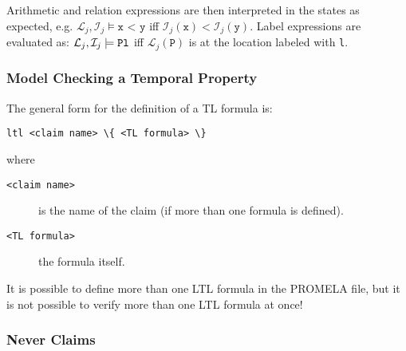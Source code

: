 \documentclass[a4paper, 11pt, accentcolor = tud3b]{tudreport}
\newcommand{\inlinePromela}[1]{\lstinline[language = PROMELA]|#1|}
\begin{document}
						Arithmetic and relation expressions are then interpreted in the states as expected, e.g. \( \mathcal{L}_j, \mathcal{I}_j \models \texttt{x < y} \) iff \( \mathcal{I}_j(\texttt{x}) < \mathcal{I}_j(\texttt{y}) \). Label expressions are evaluated as: \( \mathcal{L}_j, \mathcal{I}_j \models \texttt{P\@l} \) iff \( \mathcal{L}_j(\texttt{P}) \) is at the location labeled with \texttt{l}.
				
				\subsubsection{Model Checking a Temporal Property}
					\label{sec:temporalProp}
				
					The general form for the definition of a TL formula is:
					\begin{center}
						\inlinePromela{ltl <claim name> \{ <TL formula> \}}
					\end{center}
					where
					\begin{description}
						\item[\texttt{<claim name>}] is the name of the claim (if more than one formula is defined).
						\item[\texttt{<TL formula>}] the formula itself.
					\end{description}
				
					It is possible to define more than one LTL formula in the PROMELA file, but it is not possible to verify more than one LTL formula at once!
				
				\subsubsection{Never Claims}
					\label{sec:neverclaim}
				
\end{document}
